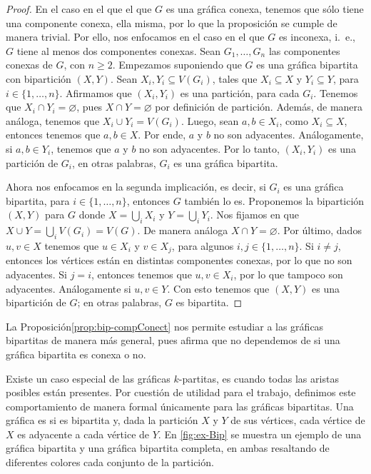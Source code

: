 \begin{proof}
    En el caso en el que el que $G$ es una gr\'afica conexa, tenemos que s\'olo
    tiene una componente conexa, ella misma, por lo que la proposici\'on se
    cumple de manera trivial. Por ello, nos enfocamos en el caso en el que $G$
    es inconexa, i.~e., $G$ tiene al menos dos componentes conexas. Sean $G_1,
    \dots, G_n$ las componentes conexas de $G$, con $n \geq 2$. Empezamos
    suponiendo que $G$ es una gr\'afica bipartita con bipartici\'on $(X,Y)$.
    Sean $X_i, Y_i\subseteq V(G_i)$, tales que $X_i \subseteq X$ y $Y_i
    \subseteq Y$, para $i \in \{1, \dots, n\}$. Afirmamos que $(X_i,Y_i)$ es una
    partici\'on, para cada $G_i$. Tenemos que $X_i \cap Y_i = \varnothing$, pues
    $X \cap Y = \varnothing$ por definici\'on de partici\'on. Adem\'as, de
    manera an\'aloga, tenemos que $X_i \cup Y_i = V(G_i)$.  Luego, sean $a, b
    \in X_i$, como $X_i \subseteq X$, entonces tenemos que $a,b \in X$. Por
    ende, $a$ y $b$ no son adyacentes. An\'alogamente, si $a,b \in Y_i$, tenemos
    que $a$ y $b$ no son adyacentes. Por lo tanto, $(X_i, Y_i)$ es una
    partici\'on de $G_i$, en otras palabras, $G_i$ es una gr\'afica bipartita.

    Ahora nos enfocamos en la segunda implicaci\'on, es decir, si $G_i$ es una
    gr\'afica bipartita, para $i \in \{1, \dots, n\}$, entonces $G$ tambi\'en lo
    es. Proponemos la bipartici\'on $(X,Y)$ para $G$ donde $X =
    \bigcup\limits_{i} X_i$ y $Y =\bigcup\limits_{i}  Y_i$. Nos fijamos en que $X \cup
    Y = \bigcup \limits_{i}  V(G_i)=V(G)$. De manera an\'aloga $X \cap Y =
    \varnothing$. Por \'ultimo, dados $u,v \in X$ tenemos que $u \in X_i$ y $v
    \in X_j$, para algunos $i,j \in \{1, \dots,n\}$. Si $i \neq j$, entonces los
    v\'ertices est\'an en distintas componentes conexas, por lo que no son
    adyacentes. Si $j=i$, entonces tenemos que $u,v \in X_i$, por lo que tampoco
    son adyacentes. An\'alogamente si $u,v \in Y$. Con esto tenemos que $(X,Y)$
    es una bipartici\'on de $G$; en otras palabras, $G$ es bipartita.
\end{proof}

La Proposici\'on\ref{prop:bip-compConect} nos permite estudiar a las gr\'aficas
bipartitas de manera m\'as general, pues afirma que no dependemos de si una
gr\'afica bipartita es conexa o no.


Existe un caso especial de las gr\'aficas $k$-partitas, es cuando todas las
aristas posibles est\'an presentes. Por cuesti\'on de utilidad para el trabajo,
definimos este comportamiento de manera formal \'unicamente para las gr\'aficas
bipartitas. Una gr\'afica es  si es bipartita y, dada la partici\'on $X$ y
$Y$ de sus v\'ertices, cada v\'ertice de $X$ es adyacente a cada v\'ertice de
$Y$. En \cref{fig:ex-Bip} se muestra un ejemplo de una gr\'afica bipartita y una
gr\'afica bipartita completa, en ambas resaltando de diferentes colores cada
conjunto de la partici\'on. 

